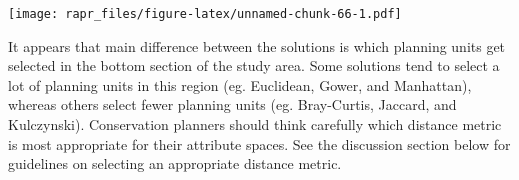 \documentclass[11pt,]{article}
\newenvironment{Shaded}{\begin{snugshade}}{\end{snugshade}}
\newcommand{\KeywordTok}[1]{\textcolor[rgb]{0.13,0.29,0.53}{\textbf{{#1}}}}
\newcommand{\DataTypeTok}[1]{\textcolor[rgb]{0.13,0.29,0.53}{{#1}}}
\newcommand{\DecValTok}[1]{\textcolor[rgb]{0.00,0.00,0.81}{{#1}}}
\newcommand{\FloatTok}[1]{\textcolor[rgb]{0.00,0.00,0.81}{{#1}}}
\newcommand{\StringTok}[1]{\textcolor[rgb]{0.31,0.60,0.02}{{#1}}}
\newcommand{\CommentTok}[1]{\textcolor[rgb]{0.56,0.35,0.01}{\textit{{#1}}}}
\newcommand{\OtherTok}[1]{\textcolor[rgb]{0.56,0.35,0.01}{{#1}}}
\newcommand{\NormalTok}[1]{{#1}}
\let\origfigure\figure
\let\endorigfigure\endfigure
\renewenvironment{figure}[1][2] {
	\expandafter\origfigure\expandafter[H]
} {
	\endorigfigure
}
\begin{document}
\begin{Shaded}
\end{Shaded}

\begin{figure}[htbp]
\centering
\texttt{[image: rapr\_files/figure-latex/unnamed-chunk-66-1.pdf]}
\caption{Prioritisations generated using different distance metrics. See
Figure 12 for conventions.}
\end{figure}

It appears that main difference between the solutions is which planning
units get selected in the bottom section of the study area. Some
solutions tend to select a lot of planning units in this region (eg.
Euclidean, Gower, and Manhattan), whereas others select fewer planning
units (eg. Bray-Curtis, Jaccard, and Kulczynski). Conservation planners
should think carefully which distance metric is most appropriate for
their attribute spaces. See the discussion section below for guidelines
on selecting an appropriate distance metric.
\end{document}

